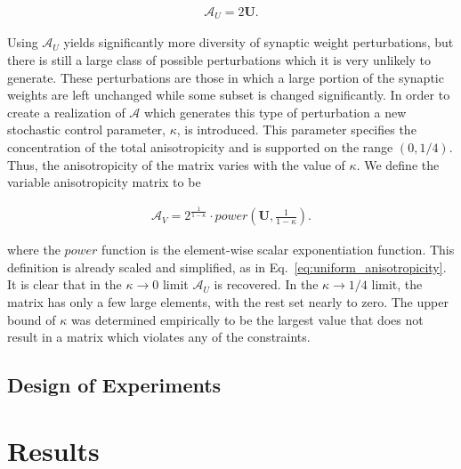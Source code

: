 \documentclass[11pt]{afthesis}
\begin{document}
	\begin{align}
	\boldsymbol{\mathcal{A}}_U =  2 \boldsymbol{U}.
	\label{eq:uniform_anisotropicity}
	\end{align}
	
	Using $\boldsymbol{\mathcal{A}}_U$ yields significantly more diversity of synaptic weight perturbations, but there is still a large class of possible perturbations which it is very unlikely to generate. These perturbations are those in which a large portion of the synaptic weights are left unchanged while some subset is changed significantly. In order to create a realization of $\boldsymbol{\mathcal{A}}$ which generates this type of perturbation a new stochastic control parameter, $\kappa$, is introduced. This parameter specifies the concentration of the total anisotropicity and is supported on the range $(0, 1/4)$. Thus, the anisotropicity of the matrix varies with the value of  $\kappa$. We define the variable anisotropicity matrix to be
	
	
	\begin{align}
	\boldsymbol{\mathcal{A}}_V =  2^{\frac{1}{1-\kappa}} \cdot power\left(\boldsymbol{U}, {\frac{1}{1-\kappa}}\right).
	\end{align}
	
	\noindent where the $power$ function is the element-wise scalar exponentiation function. This definition is already scaled and simplified, as in Eq.~\ref{eq:uniform_anisotropicity}. It is clear that in the $\kappa \rightarrow 0$ limit $\boldsymbol{\mathcal{A}}_U$ is recovered. In the $\kappa \rightarrow 1/4$ limit, the matrix has only a few large elements, with the rest set nearly to zero. The upper bound of $\kappa$ was determined empirically to be the largest value that does not result in a matrix which violates any of the constraints.

	\section{Design of Experiments}
	
	
	\chapter{Results}
	
	\makeatletter
	\def\fixedlabel#1#2{%
		\@bsphack%
		\protected@write\@auxout{}%
		{\string\newlabel{#1}{{#2}{\thepage}}}%
		\@esphack}
	\makeatother
	
\end{document}
